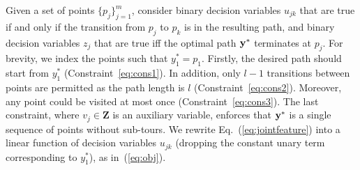 Given a set of points $\{p_j\}_{j=1}^m$,
consider binary decision variables $u_{jk}$ that are true if and only if
the transition from $p_j$ to $p_k$ is in the resulting path,
and binary decision variables $z_j$ that are true iff
the optimal path $\mathbf{y}^*$ terminates at $p_j$.
For brevity, we index the points such that $y_1^* = p_1$.
Firstly, the desired path should start from $y_1^*$ (Constraint~\ref{eq:cons1}).
In addition, only $l\!-\!1$ transitions between points are permitted as the path length is $l$ (Constraint~\ref{eq:cons2}).
Moreover, any point could be visited at most once (Constraint~\ref{eq:cons3}).
The last constraint, where $v_j \in \mathbf{Z}$ is an auxiliary variable,
enforces that $\mathbf{y}^*$ is a single sequence of points without sub-tours.
We rewrite Eq.~(\ref{eq:jointfeature}) into a linear function of decision variables $u_{jk}$
(dropping the constant unary term corresponding to $y_1^*$), as %
in~(\ref{eq:obj}).
